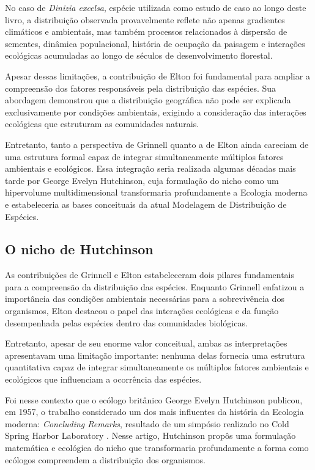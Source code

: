 No caso de \textit{Dinizia excelsa}, espécie utilizada como estudo de caso ao longo deste livro, a distribuição observada provavelmente reflete não apenas gradientes climáticos e ambientais, mas também processos relacionados à dispersão de sementes, dinâmica populacional, história de ocupação da paisagem e interações ecológicas acumuladas ao longo de séculos de desenvolvimento florestal.

Apesar dessas limitações, a contribuição de Elton foi fundamental para ampliar a compreensão dos fatores responsáveis pela distribuição das espécies. Sua abordagem demonstrou que a distribuição geográfica não pode ser explicada exclusivamente por condições ambientais, exigindo a consideração das interações ecológicas que estruturam as comunidades naturais.

Entretanto, tanto a perspectiva de Grinnell quanto a de Elton ainda careciam de uma estrutura formal capaz de integrar simultaneamente múltiplos fatores ambientais e ecológicos. Essa integração seria realizada algumas décadas mais tarde por George Evelyn Hutchinson, cuja formulação do nicho como um hipervolume multidimensional transformaria profundamente a Ecologia moderna e estabeleceria as bases conceituais da atual Modelagem de Distribuição de Espécies.

\subsection{O nicho de Hutchinson}

As contribuições de Grinnell e Elton estabeleceram dois pilares fundamentais para a compreensão da distribuição das espécies. Enquanto Grinnell enfatizou a importância das condições ambientais necessárias para a sobrevivência dos organismos, Elton destacou o papel das interações ecológicas e da função desempenhada pelas espécies dentro das comunidades biológicas.

Entretanto, apesar de seu enorme valor conceitual, ambas as interpretações apresentavam uma limitação importante: nenhuma delas fornecia uma estrutura quantitativa capaz de integrar simultaneamente os múltiplos fatores ambientais e ecológicos que influenciam a ocorrência das espécies.

Foi nesse contexto que o ecólogo britânico George Evelyn Hutchinson publicou, em 1957, o trabalho considerado um dos mais influentes da história da Ecologia moderna: \textit{Concluding Remarks}, resultado de um simpósio realizado no Cold Spring Harbor Laboratory \parencite{hutchinson1957}. Nesse artigo, Hutchinson propôs uma formulação matemática e ecológica do nicho que transformaria profundamente a forma como ecólogos compreendem a distribuição dos organismos.

